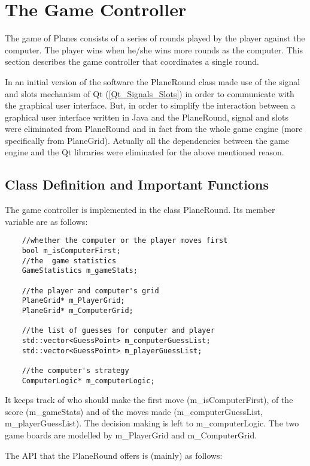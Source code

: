 \section{The Game Controller}  \label {Game_Controller}

The game of Planes consists of a series of rounds played by the player against the computer. The player wins when he/she wins more rounds as the computer. This section describes the game controller that coordinates a single round. 

In an initial version of the software the PlaneRound class made use of the signal and slots mechanism of Qt (\ref{Qt_Signals_Slots}) in order to communicate with the graphical user interface. But, in order to simplify the interaction between a graphical user interface written in Java and the PlaneRound, signal and slots were eliminated from PlaneRound and in fact from the whole game engine (more specifically from PlaneGrid). Actually all the dependencies between the game engine and the Qt libraries were eliminated for the above mentioned reason.

\subsection {Class Definition and Important Functions}

The game controller is implemented in the class PlaneRound. Its member variable are as follows:

\begin{lstlisting}
	//whether the computer or the player moves first
	bool m_isComputerFirst;
	//the  game statistics
	GameStatistics m_gameStats;
	
	//the player and computer's grid
	PlaneGrid* m_PlayerGrid;
	PlaneGrid* m_ComputerGrid;
	
	//the list of guesses for computer and player
	std::vector<GuessPoint> m_computerGuessList;
	std::vector<GuessPoint> m_playerGuessList;
	
	//the computer's strategy
	ComputerLogic* m_computerLogic;
\end{lstlisting}

It keeps track of who should make the first move (m\_isComputerFirst), of the score (m\_gameStats) and of the moves made (m\_computerGuessList, m\_playerGuessList). The decision making is left to m\_computerLogic. The two game boards are modelled by m\_PlayerGrid and m\_ComputerGrid.

The API that the PlaneRound offers is (mainly) as follows:


